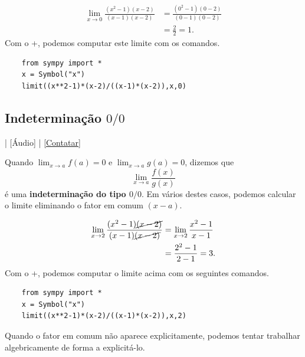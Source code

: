 \begin{ex}
  \begin{align}
    \lim_{x\to 0} \frac{(x^2-1)(x-2)}{(x-1)(x-2)} &= \frac{(0^2-1)(0-2)}{(0-1)(0-2)}\\
                                                  &= \frac{2}{2} = 1.
  \end{align}
  \ifispython
  Com o {\python}+{\sympy}, podemos computar este limite com os comandos.
  \begin{lstlisting}
    from sympy import *
    x = Symbol("x")
    limit((x**2-1)*(x-2)/((x-1)*(x-2)),x,0)
  \end{lstlisting}
  \fi
\end{ex}

\subsection{Indeterminação $0/0$}

\begin{flushright}
  [Vídeo] | [Áudio] | \href{https://phkonzen.github.io/notas/contato.html}{[Contatar]}
\end{flushright}

Quando $\displaystyle \lim_{x\to a} f(a)=0$ e $\displaystyle \lim_{x\to a} g(a)=0$, dizemos que
\begin{equation}
  \lim_{x\to a} \frac{f(x)}{g(x)}
\end{equation}
é uma {\bf indeterminação do tipo $0/0$}. Em vários destes casos, podemos calcular o limite eliminando o fator em comum $(x-a)$.

\begin{ex}
  \begin{align}
    \lim_{x\to 2}\frac{(x^2-1)\cancel{(x-2)}}{(x-1)\cancel{(x-2)}} &= \lim_{x\to 2} \frac{x^2-1}{x-1}\\
                                                                   &= \frac{2^2-1}{2-1} = 3.
  \end{align}
  \ifispython
  Com o {\python}+{\sympy}, podemos computar o limite acima com os seguintes comandos.
  \begin{lstlisting}
    from sympy import *
    x = Symbol("x")
    limit((x**2-1)*(x-2)/((x-1)*(x-2)),x,2)
  \end{lstlisting}
  \fi
\end{ex}

Quando o fator em comum não aparece explicitamente, podemos tentar trabalhar algebricamente de forma a explicitá-lo.

